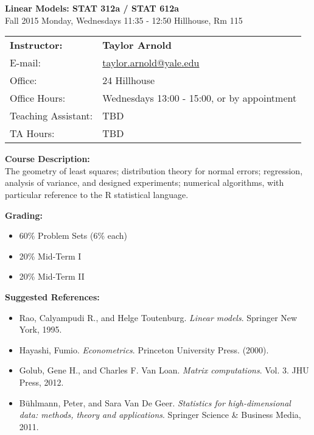 \documentclass[12pt]{article}
\begin{document}
\begin{center}
{\bf Linear Models: STAT 312a / STAT 612a} \\
Fall 2015 \quad Monday, Wednesdays 11:35 - 12:50  Hillhouse, Rm 115
\end{center}

\bigskip

\noindent
\begin{tabular}{ l l }
{\bf Instructor:} &  {\bf Taylor Arnold} \\
E-mail: & \href{mailto:taylor.arnold@yale.edu}{taylor.arnold@yale.edu} \\
Office: & 24 Hillhouse \\
Office Hours: & Wednesdays 13:00 - 15:00, or by appointment \\
Teaching Assistant: & TBD \\
TA Hours: & TBD
\end{tabular}

\vspace{1cm}

{\bf Course Description:} \\
The geometry of least squares; distribution theory for normal errors; regression, analysis of variance, and designed experiments; numerical algorithms, with particular reference to the R statistical language.

\vspace{0.5cm}

{\bf Grading:}
\begin{itemize}\setlength\itemsep{0em}
\item 60\% Problem Sets (6\% each)
\item 20\% Mid-Term I
\item 20\% Mid-Term II
\end{itemize}

\vspace{0.5cm}

{\bf Suggested References:}
\begin{itemize}\setlength\itemsep{0em}
\item Rao, Calyampudi R., and Helge Toutenburg. {\it Linear models}. Springer New York, 1995.
\item Hayashi, Fumio. {\it Econometrics}. Princeton University Press. (2000).
\item Golub, Gene H., and Charles F. Van Loan. {\it Matrix computations}. Vol. 3. JHU Press, 2012.
\item Bühlmann, Peter, and Sara Van De Geer. {\it Statistics for high-dimensional data: methods, theory and applications}. Springer Science \& Business Media, 2011.
\end{itemize}
\end{document}
